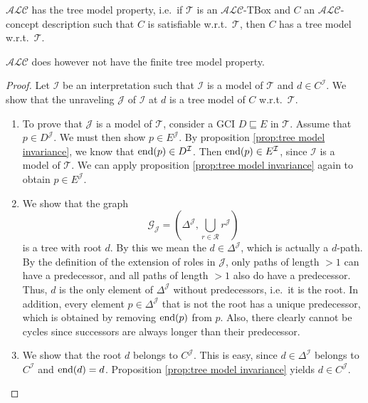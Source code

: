 \begin{theorem}\label{tree model property}
	$\mathcal{ALC}$ has the tree model property,
	i.e.\ if $\mathcal{T}$ is an $\mathcal{ALC}$-TBox and $C$ an $\mathcal{ALC}$-concept description
	such that $C$ is satisfiable w.r.t.\ $\mathcal{T}$, then $C$ has a tree model w.r.t.\ $\mathcal{T}$.
\end{theorem}
\begin{note}
	$\mathcal{ALC}$ does however not have the finite tree model property.
\end{note}
\begin{proof}
	Let $\mathcal{I}$ be an interpretation such that $\mathcal{I}$ is a model of $\mathcal{T}$ and $d \in C^{\mathcal{I}}$.
	We show that the unraveling $\mathcal{J}$ of $\mathcal{I}$ at $d$ is a tree model of $C$ w.r.t.\ $\mathcal{T}$.
	\begin{enumerate}
		\item To prove that $\mathcal{J}$ is a model of $\mathcal{T}$,
			consider a GCI $D \sqsubseteq E$ in $\mathcal{T}$.
			Assume that $p \in D^{\mathcal{J}}$.
			We must then show $p \in E^{\mathcal{J}}$.
			By proposition \ref{prop:tree model invariance},
			we know that $\operatorname{\text{end}}(p) \in D^{\mathcal{I}}$.
			Then $\operatorname{\text{end}}(p) \in E^{\mathcal{I}}$, since $\mathcal{I}$ is a model of $\mathcal{T}$.
			We can apply proposition \ref{prop:tree model invariance} again to obtain $p \in E^{\mathcal{J}}$.
		\item We show that  the graph
			\[
				\mathcal{G}_{\mathcal{J}} = \left( \Delta^{\mathcal{J}}, \bigcup_{r \in \mathscr{R}} r^{\mathcal{J}} \right)
			\]
			is a tree with root $d$.
			By this we mean the $d \in \Delta^{\mathcal{J}}$, which is actually a $d$-path.
			By the definition of the extension of roles in $\mathcal{J}$,
			only paths of length $> 1$ can have a predecessor,
			and all paths of length $> 1$ also do have a predecessor.
			Thus, $d$ is the only element of $\Delta^{\mathcal{J}}$ without predecessors,
			i.e.\ it is the root.
			In addition, every element $p \in \Delta^{\mathcal{J}}$ that is not the root has a unique predecessor,
			which is obtained by removing $\operatorname{\text{end}}(p)$ from $p$.
			Also, there clearly cannot be cycles since successors are always longer than their predecessor.
		\item We show that the root $d$ belongs to $C^{\mathcal{J}}$.
			This is easy, since $d \in \Delta^{\mathcal{I}}$ belongs to $C^{\mathcal{I}}$ and $\operatorname{\text{end}}(d)=d$.
			Proposition \ref{prop:tree model invariance} yields $d \in C^{\mathcal{J}}$. \qedhere
	\end{enumerate}
\end{proof}


